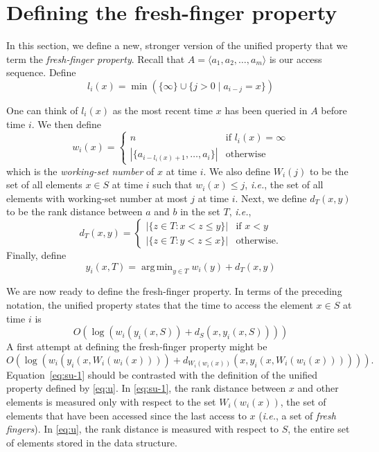 \documentclass{llncs}
\newcommand{\ie}{\textsl{i.e.}}
\newcommand{\BigOh}[1]{O\!\left(#1\right)}
\DeclareMathOperator*{\argmin}{arg\,min}
\begin{document}
\section{Defining the fresh-finger property}
\label{section:definitions}

In this section, we define a new, stronger version of the unified property that we term the \emph{fresh-finger property}. Recall that $A = \langle a_1, a_2, \ldots, a_m \rangle$ is our access sequence. Define
\begin{displaymath}
	l_i(x) = \min \left( \{ \infty \} \cup \{ j > 0 \;|\; a_{i-j} = x \} \right)
\end{displaymath}

One can think of $l_i(x)$ as the most recent time $x$ has been queried in $A$ before time $i$. We then define
\begin{displaymath}
	w_i(x) =
		\begin{cases}
			n 																	& \text{if } l_i(x) = \infty \\
			|\{ a_{i-l_i(x)+1}, \ldots, a_i \}|	& \text{otherwise}
		\end{cases} 
\end{displaymath}
%
which is the \emph{working-set number} of $x$ at time $i$. We also define $W_i(j)$ to be the set of all elements $x \in S$ at time $i$ such that $w_i(x) \le j$, \ie, the set of all elements with working-set number at most $j$ at time $i$.  Next, we define $d_T(x,y)$ to be the rank distance between $a$ and $b$ in the set $T$, \ie,
\[
   d_T(x,y) 
    = \begin{cases}   
      |\{z\in T: x< z \le y\}| & \text{if $x<y$} \\
      |\{z\in T: y< z \le x\}| & \text{otherwise.}
    \end{cases}
\]
Finally, define
\begin{displaymath}
	y_i(x, T) = \argmin_{y \in T} w_i(y) + d_T(x,y)
\end{displaymath}

We are now ready to define the fresh-finger property. In terms of the preceding notation, the unified property states that the time to access the element $x \in S$ at time $i$ is 
\begin{equation}
	\BigOh{\log (w_i(y_i(x,S)) + d_S(x,y_i(x,S)))}
        \label{eq:u}
\end{equation}
%
A first attempt at defining the fresh-finger property might be 
\begin{equation}
	\BigOh{\log (w_i(y_i(x,W_i(w_i(x)))) + d_{W_i(w_i(x))}(x,y_i(x,W_i(w_i(x)))))}. \label{eq:su-1}
\end{equation}
Equation~\eqref{eq:su-1} should be contrasted with the definition of the unified property defined by \eqref{eq:u}.  In \eqref{eq:su-1}, the rank distance between $x$ and other elements is measured only with respect to the set $W_i(w_i(x))$, the set of elements that have been accessed since the last access to $x$ (\ie, a set of \emph{fresh fingers}).  In \eqref{eq:u}, the rank distance is measured with respect to $S$, the entire set of elements stored in the data structure.
\end{document}
